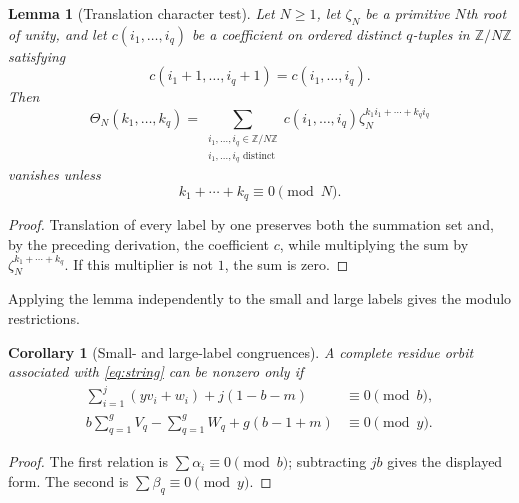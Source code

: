 \documentclass[11pt]{amsart}
\newtheorem{lemma}[theorem]{Lemma}
\newtheorem{corollary}[theorem]{Corollary}
\theoremstyle{remark}
\newcommand{\Z}{\mathbb{Z}}
\begin{document}
\begin{lemma}[Translation character test]\label{lem:translation}
Let $N\geq1$, let $\zeta_N$ be a primitive $N$th root of unity, and let $c(i_1,\ldots,i_q)$ be a coefficient on ordered distinct $q$-tuples in $\Z/N\Z$ satisfying
\[
    c(i_1+1,\ldots,i_q+1)=c(i_1,\ldots,i_q).
\]
Then
\begin{equation}\label{eq:theta}
 \Theta_N(k_1,\ldots,k_q)
 =\sum_{\substack{i_1,\ldots,i_q\in\Z/N\Z\\
                   i_1,\ldots,i_q\text{ distinct}}}
 c(i_1,\ldots,i_q)
 \zeta_N^{k_1i_1+\cdots+k_qi_q}
\end{equation}
vanishes unless
\begin{equation}\label{eq:charsumzero}
    k_1+\cdots+k_q\equiv0\pmod N.
\end{equation}
\end{lemma}

\begin{proof}
Translation of every label by one preserves both the summation set and, by the preceding derivation, the coefficient $c$, while multiplying the sum by $\zeta_N^{k_1+\cdots+k_q}$.  If this multiplier is not $1$, the sum is zero.
\end{proof}

Applying the lemma independently to the small and large labels gives the modulo restrictions.

\begin{corollary}[Small- and large-label congruences]\label{cor:labelcongruences}
A complete residue orbit associated with \eqref{eq:string} can be nonzero only if
\begin{align}
 \sum_{i=1}^{j}(yv_i+w_i)+j(1-b-m)
 &\equiv0\pmod b,
 \label{eq:smallcongruence}\\
 b\sum_{q=1}^{g}V_q-\sum_{q=1}^{g}W_q
   +g(b-1+m)
 &\equiv0\pmod y.
 \label{eq:largecongruence}
\end{align}
\end{corollary}

\begin{proof}
The first relation is $\sum\alpha_i\equiv0\pmod b$; subtracting $jb$ gives the displayed form.  The second is $\sum\beta_q\equiv0\pmod y$.
\end{proof}
\end{document}
